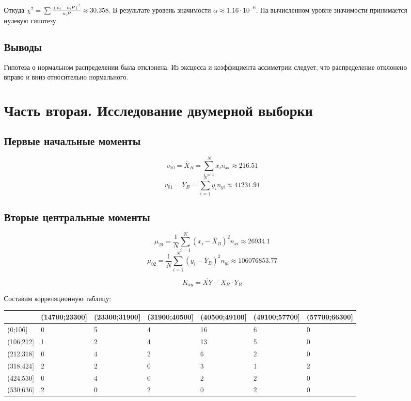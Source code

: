\documentclass[titlepage]{article}
\begin{document}
Откуда $\chi^2 = \sum \frac{(n_i - n_i P)^2}{n_i P} \approx 30.358$. В результате уровень значимости $\alpha \approx 1.16 \cdot 10^{-6}$. На вычисленном уровне значимости принимается нулевую гипотезу.

\subsection{Выводы}
Гипотеза о нормальном распределении была отклонена. Из эксцесса и коэффициента ассиметрии следует, что распределение отклонено вправо и вниз относительно нормального.

\section{Часть вторая. Исследование двумерной выборки}
\subsection{Первые начальные моменты}
\begin{equation*}
v_{10} = \overline{X}_B = \sum_{i=1}^N x_i n_{xi} \approx 216.51
\end{equation*}
\begin{equation*}
v_{01} = \overline{Y}_B = \sum_{i=1}^N y_i n_{yi} \approx 41231.91
\end{equation*}

\subsection{Вторые центральные моменты}
\begin{equation*}
\mu_{20} = \frac{1}{N} \sum_{i = 1}^N (x_i - \overline{X}_B)^2 n_{xi} \approx 26934.1
\end{equation*}
\begin{equation*}
\mu_{02} = \frac{1}{N} \sum_{i = 1}^N (y_i - \overline{Y}_B)^2 n_{yi} \approx 106076853.77
\end{equation*}

\begin{equation*}
K_{xy} = \overline{XY} - X_B \cdot Y_B
\end{equation*}

\clearpage
Составим корреляционную таблицу:
\begin{table}[!ht]
    \centering
    \begin{tabular}{|l|l|l|l|l|l|l|}
    \hline
        ~ & (14700;23300] & (23300;31900] & (31900;40500] & (40500;49100] & (49100;57700] & (57700;66300] \\ \hline
        (0;106] & 0 & 5 & 4 & 16 & 6 & 0 \\ \hline
        (106;212] & 1 & 2 & 4 & 13 & 5 & 0 \\ \hline
        (212;318] & 0 & 4 & 2 & 6 & 2 & 0 \\ \hline
        (318;424] & 2 & 2 & 0 & 3 & 1 & 2 \\ \hline
        (424;530] & 0 & 4 & 0 & 2 & 2 & 0 \\ \hline
        (530;636] & 2 & 0 & 2 & 0 & 2 & 0 \\ \hline
    \end{tabular}
\end{table}
\end{document}
